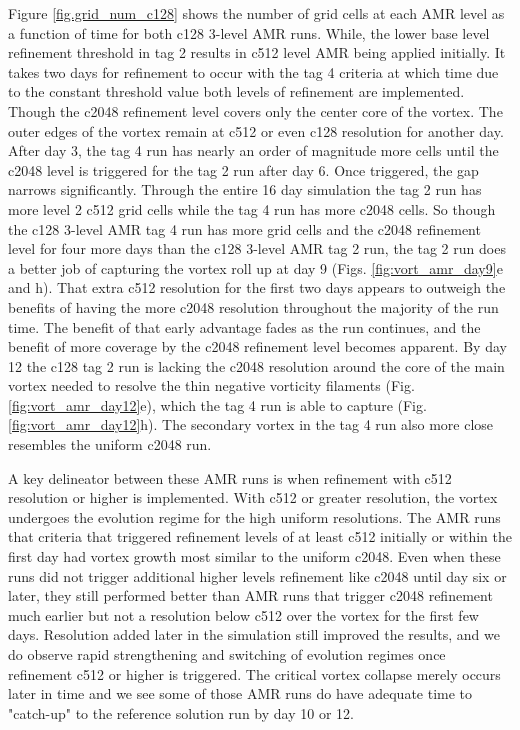 Figure \ref{fig.grid_num_c128} shows the number of grid cells at each AMR 
level as a function of time for both c128 3-level AMR runs.  While, the lower 
base level refinement threshold in tag 2 results in c512 level AMR being applied
initially. It takes two days for refinement to occur with the tag 4 criteria at which time
due to the constant threshold value both levels of refinement are implemented.
Though the c2048 refinement level 
covers only the center core of the vortex. The outer edges of the vortex remain at
c512 or even c128 resolution for another day.
After day 3, the tag 4 run has nearly an order of magnitude more cells until the c2048
level is triggered for the tag 2 run after day 6. Once triggered,  the gap narrows significantly. 
Through the entire 16 day simulation the tag 2 run has more level 2 c512 grid
cells while the tag 4 run has more c2048 cells. So though the c128 3-level AMR tag 4 run
has more grid cells and the c2048 refinement level for four more days than the 
c128 3-level AMR tag 2 run, the tag 2 run does a better job of capturing the vortex roll up at day 9 
(Figs. \ref{fig:vort_amr_day9}e and h).
That extra c512 resolution for the first two days appears to outweigh the benefits 
of having the more c2048 resolution throughout the majority of the run time. 
The benefit of that early advantage fades as the run continues, and the benefit of more coverage by
the c2048 refinement level becomes apparent. By day 12 
the c128 tag 2 run is lacking the c2048 resolution around the core of the main 
vortex needed to resolve the thin negative vorticity filaments (Fig. \ref{fig:vort_amr_day12}e), 
which the tag 4 run is able to capture (Fig. \ref{fig:vort_amr_day12}h). 
The secondary vortex in the tag 4 run also more close resembles the uniform c2048 run.

A key delineator between these AMR runs is when refinement with c512 resolution or
higher is implemented. With c512 or greater resolution, the vortex undergoes the evolution regime for
the high uniform resolutions.  The AMR runs that criteria that triggered refinement levels 
of at least c512 initially or within the first day had vortex growth most similar to the uniform c2048. 
Even when these runs did not trigger additional higher levels refinement like c2048
until day six or later, they still performed better than AMR runs that trigger c2048 refinement
much earlier but not a resolution below c512 over the vortex for the first few days.  
Resolution added later in the simulation still improved the results, and we do observe 
rapid strengthening and switching of evolution regimes once
 refinement c512 or higher is triggered. The critical vortex collapse merely occurs later in time and we
see some of those AMR runs do have adequate time to "catch-up" to the reference solution run by day 10 
or 12.

